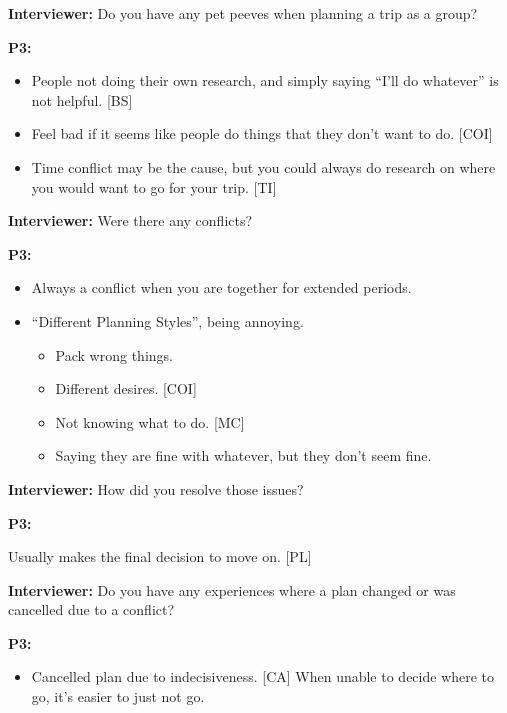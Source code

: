\documentclass[12pt,a4paper]{article}
\begin{document}
\textbf{Interviewer: }Do you have any pet peeves when planning a trip as a group? 

\textbf{P3: }

\begin{itemize}
    \item People not doing their own research, and simply saying “I’ll do whatever” is not helpful. [BS]
    \item Feel bad if it seems like people do things that they don’t want to do. [COI]
    \item Time conflict may be the cause, but you could always do research on where you would want to go for your trip. [TI]
\end{itemize}

\textbf{Interviewer: }Were there any conflicts? 

\textbf{P3: }
\begin{itemize}
    \item Always a conflict when you are together for extended periods. 
\end{itemize}

\begin{itemize}
    \item “Different Planning Styles”, being annoying.
    \begin{itemize}
        \item Pack wrong things.
        \item Different desires. [COI]
        \item Not knowing what to do. [MC]
        \item Saying they are fine with whatever, but they don’t seem fine.
    \end{itemize}
\end{itemize}

\textbf{Interviewer: }How did you resolve those issues? 

\textbf{P3: }

Usually makes the final decision to move on. [PL]

\textbf{Interviewer: }Do you have any experiences where a plan changed or was cancelled due to a conflict? 

\textbf{P3: }

\begin{itemize}
    \item Cancelled plan due to indecisiveness. [CA]
When unable to decide where to go, it’s easier to just not go. 

\end{itemize}
\end{document}
